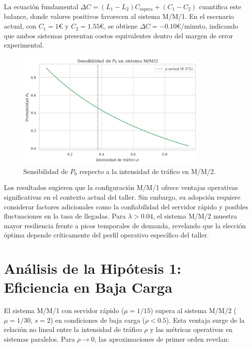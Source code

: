 \documentclass[12pt, a4paper]{article}
\begin{document}
    La ecuación fundamental $\Delta C = (L_1 - L_2)C_{\text{espera}} + (C_1 - C_2)$ cuantifica este balance, donde valores positivos favorecen al sistema M/M/1. En el escenario actual, con $C_1 = 1$€ y $C_2 = 1.55$€, se obtiene $\Delta C = -0.10$€/minuto, indicando que ambos sistemas presentan costos equivalentes dentro del margen de error experimental.
    
    \begin{figure}[H]
    	\centering
    	\includegraphics[width=0.85\textwidth]{figures/sensibilidad_p0.png}
    	\caption{Sensibilidad de $P_0$ respecto a la intensidad de tráfico en M/M/2.}
    	\label{fig:sensibilidad}
    \end{figure}
    
    Los resultados sugieren que la configuración M/M/1 ofrece ventajas operativas significativas en el contexto actual del taller. Sin embargo, su adopción requiere considerar factores adicionales como la confiabilidad del servidor rápido y posibles fluctuaciones en la tasa de llegadas. Para $\lambda > 0.04$, el sistema M/M/2 muestra mayor resiliencia frente a picos temporales de demanda, revelando que la elección óptima depende críticamente del perfil operativo específico del taller.
    
    \section{Análisis de la Hipótesis 1: Eficiencia en Baja Carga}
    \label{sec:hipotesis1}
    
    El sistema M/M/1 con servidor rápido ($\mu = 1/15$) supera al sistema M/M/2 ($\mu = 1/30$, $s=2$) en condiciones de baja carga ($\rho < 0.5$). Esta ventaja surge de la relación no lineal entre la intensidad de tráfico $\rho$ y las métricas operativas en sistemas paralelos. Para $\rho \to 0$, las aproximaciones de primer orden revelan:
    
\end{document}
